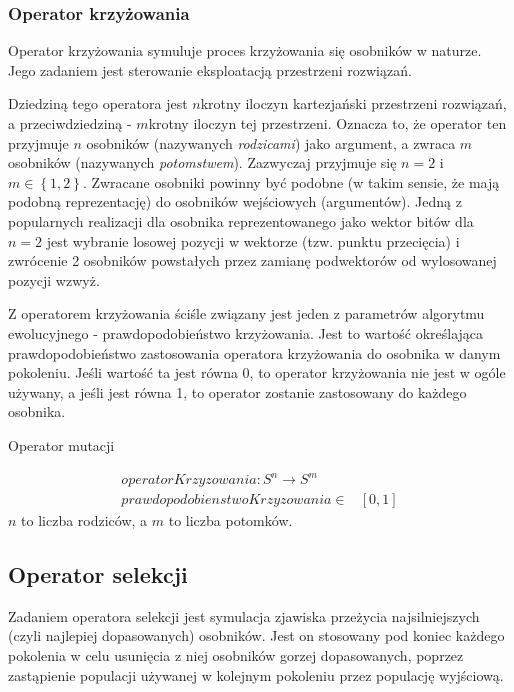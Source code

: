 \documentclass[twoside]{iisthesis}
\begin{document}
\subsubsection{Operator krzyżowania}

Operator krzyżowania symuluje proces krzyżowania się osobników w naturze. Jego zadaniem jest sterowanie eksploatacją przestrzeni rozwiązań.

Dziedziną tego operatora jest $n$krotny iloczyn kartezjański przestrzeni rozwiązań, a przeciwdziedziną - $m$krotny iloczyn tej przestrzeni. Oznacza to, że operator ten przyjmuje $n$ osobników (nazywanych \emph{rodzicami}) jako argument, a zwraca $m$ osobników (nazywanych \emph{potomstwem}). Zazwyczaj przyjmuje się $ n = 2 $ i $m \in \left\{1, 2 \right\}$. Zwracane osobniki powinny być podobne (w takim sensie, że mają podobną reprezentację) do osobników wejściowych (argumentów). Jedną z popularnych realizacji dla osobnika reprezentowanego jako wektor bitów dla $n=2$ jest wybranie losowej pozycji w wektorze (tzw. punktu przecięcia) i zwrócenie 2 osobników powstałych przez zamianę podwektorów od wylosowanej pozycji wzwyż.

Z operatorem krzyżowania ściśle związany jest jeden z parametrów algorytmu ewolucyjnego - prawdopodobieństwo krzyżowania. Jest to wartość określająca prawdopodobieństwo zastosowania operatora krzyżowania do osobnika w danym pokoleniu. Jeśli wartość ta jest równa 0, to operator krzyżowania nie jest w ogóle używany, a jeśli jest równa 1, to operator zostanie zastosowany do każdego osobnika.

\begin{signature}
	\caption{Operator mutacji \label{signature_mutation}}
	\begin{align}
	operatorKrzyzowania: S^n \rightarrow S^m \\
	prawdopodobienstwoKrzyzowania \in &[0, 1]
	\end{align}
	$n$ to liczba rodziców, a $m$ to liczba potomków.
\end{signature}	

\subsection{Operator selekcji} \label{subsection_natSel}

Zadaniem operatora selekcji jest symulacja zjawiska przeżycia najsilniejszych (czyli najlepiej dopasowanych) osobników. Jest on stosowany pod koniec każdego pokolenia w celu usunięcia z niej osobników gorzej dopasowanych, poprzez zastąpienie populacji używanej w kolejnym pokoleniu przez populację wyjściową.
\end{document}
